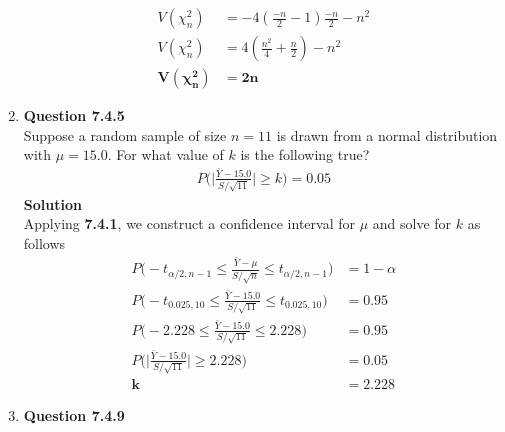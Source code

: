 \documentclass{uofa-eng-assignment}
\begin{document}
\begin{enumerate}
\begin{align*}
            V(\chi^2_n)              & = -4(\frac{-n}{2} - 1)\frac{-n}{2} - n^2             \\
            V(\chi^2_n)              & = 4(\frac{n^2}{4} + \frac{n}{2}) - n^2               \\
            \boldsymbol{V(\chi^2_n)} & \boldsymbol{= 2n}
        \end{align*}
    \item[]
        \textbf{Question 7.4.5} \\
        Suppose a random sample of size $n=11$ is drawn from a normal distribution with $\mu = 15.0$. For what value of $k$
        is the following true?
        \begin{align*}
            P\big( \big| \frac{\bar{Y} - 15.0}{S/\sqrt{11}} \big| \geq k \big) = 0.05
        \end{align*}
        \textbf{Solution} \\
        Applying \textbf{7.4.1}, we construct a confidence interval for $\mu$ and solve for $k$ as follows
        \begin{align*}
            P\big(-t_{\alpha/2, n-1} \leq \frac{\bar{Y} - \mu}{S/\sqrt{n}} \leq t_{\alpha/2, n-1} \big) & = 1 - \alpha         \\
            P\big(-t_{0.025, 10} \leq \frac{\bar{Y} - 15.0}{S/\sqrt{11}} \leq t_{0.025, 10} \big)       & = 0.95               \\
            P\big(-2.228 \leq \frac{\bar{Y} - 15.0}{S/\sqrt{11}} \leq 2.228 \big)                       & = 0.95               \\
            P\big(\big| \frac{\bar{Y} - 15.0}{S/\sqrt{11}} \big| \geq 2.228 \big)                       & = 0.05               \\
            \boldsymbol{k}                                                                              & \boldsymbol{= 2.228}
        \end{align*}
    \item[]
        \textbf{Question 7.4.9} \\


\end{enumerate}
\end{document}
